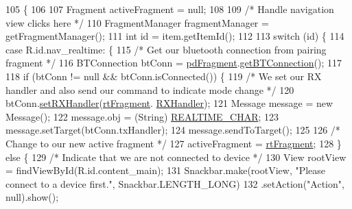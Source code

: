 \begin{DoxyCode}
105                                                            \{
106 
107         Fragment activeFragment = null;
108 
109         \textcolor{comment}{/* Handle navigation view clicks here */}
110         FragmentManager fragmentManager = getFragmentManager();
111         \textcolor{keywordtype}{int} \textcolor{keywordtype}{id} = item.getItemId();
112 
113         \textcolor{keywordflow}{switch} (\textcolor{keywordtype}{id}) \{
114             \textcolor{keywordflow}{case} R.id.nav\_realtime: \{
115                 \textcolor{comment}{/* Get our bluetooth connection from pairing fragment */}
116                 BTConnection btConn = \hyperlink{classcom_1_1jack_1_1motorbikestatistics_1_1_main_activity_a2802ad16b5fdba42834d1b31e255dd96}{pdFragment}.\hyperlink{classcom_1_1jack_1_1motorbikestatistics_1_1_pair_device_fragment_a32debe1358d94bb1c972137f60d1aa36}{getBTConnection}();
117 
118                 \textcolor{keywordflow}{if} (btConn != null && btConn.isConnected()) \{
119                     \textcolor{comment}{/* We set our RX handler and also send our command to indicate mode change */}
120                     btConn.\hyperlink{classcom_1_1jack_1_1motorbikestatistics_1_1_b_t_connection_aae8ee75e78f5beff98572bf3b13a60b8}{setRXHandler}(\hyperlink{classcom_1_1jack_1_1motorbikestatistics_1_1_main_activity_a5d506143e7f082edf2078025c00f3715}{rtFragment}.
      \hyperlink{classcom_1_1jack_1_1motorbikestatistics_1_1_realtime_fragment_a7b39a40287200b7530c2d935e6717fa6}{RXHandler});
121                     Message message = \textcolor{keyword}{new} Message();
122                     message.obj = (String) \hyperlink{classcom_1_1jack_1_1motorbikestatistics_1_1_main_activity_a6b63eb4aa15fd17f95f5d717e0e63108}{REALTIME\_CHAR};
123                     message.setTarget(btConn.txHandler);
124                     message.sendToTarget();
125 
126                     \textcolor{comment}{/* Change to our new active fragment */}
127                     activeFragment = \hyperlink{classcom_1_1jack_1_1motorbikestatistics_1_1_main_activity_a5d506143e7f082edf2078025c00f3715}{rtFragment};
128                 \} \textcolor{keywordflow}{else} \{
129                     \textcolor{comment}{/* Indicate that we are not connected to device */}
130                     View rootView = findViewById(R.id.content\_main);
131                     Snackbar.make(rootView, \textcolor{stringliteral}{"Please connect to a device first."}, Snackbar.LENGTH\_LONG)
132                             .setAction(\textcolor{stringliteral}{"Action"}, null).show();

\end{DoxyCode}
